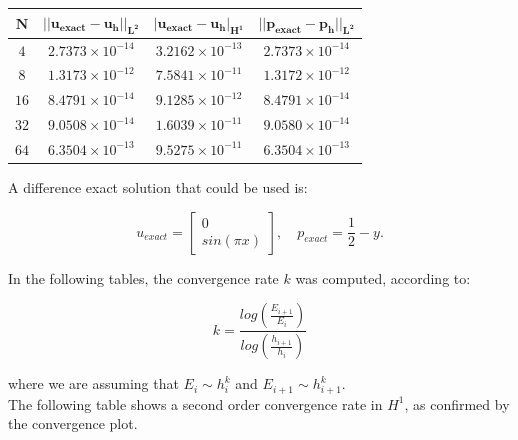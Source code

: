 \documentclass[11pt,a4paper,titlepage]{report}
\begin{document}
\begin{center}
\begin{tabular}{| c | c | c | c |}
\hline
$\mathbf{N}$ & $\mathbf{|| u_{exact} - u_h ||_{L^2}}$ & $ \mathbf{ | u_{exact} - u_h |_{H^1}}$ & $  \mathbf{ || p_{exact} - p_h ||_{L^2}}$ \\
\hline
$ 4 $ & $2.7373 \times 10^{-14}$ & $3.2162 \times 10^{-13}$ &  $ 2.7373 \times 10^{-14}$ \\
\hline
$ 8$ & $1.3173  \times 10^{-12}$ & $7.5841 \times 10^{-11}$ &  $ 1.3172  \times 10^{-12}$ \\
\hline
$ 16 $ & $ 8.4791 \times 10^{-14}$ & $9.1285 \times 10^{-12}$ & $ 8.4791 \times 10^{-14}$ \\
\hline
$ 32$ & $9.0508 \times 10^{-14}$ & $1.6039 \times 10^{-11}$ &  $ 9.0580 \times 10^{-14}$ \\
\hline
$ 64$ & $6.3504 \times 10^{-13}$ & $9.5275 \times 10^{-11}$ &  $ 6.3504 \times 10^{-13}$ \\
\hline
\end{tabular}
\end{center}

\vspace{1cm}

A difference exact solution that could be used is:

\[
u_{exact} = \left[ \begin{array}{c} 0 \\ sin(\pi x) \end{array} \right], \quad 
p_{exact} = \frac{1}{2}-y.
\]

In the following tables, the convergence rate $k$ was computed, according to:

\[
k = \frac{log(\frac{E_{i+1}}{E_i})}{log(\frac{h_{i+1}}{h_i})}
\]

where we are assuming that $E_i \sim h^k_i$ and $E_{i+1} \sim h^k_{i+1}$. \\
The following table shows a second order convergence rate in $H^1$, as confirmed by the convergence plot.
\end{document}
